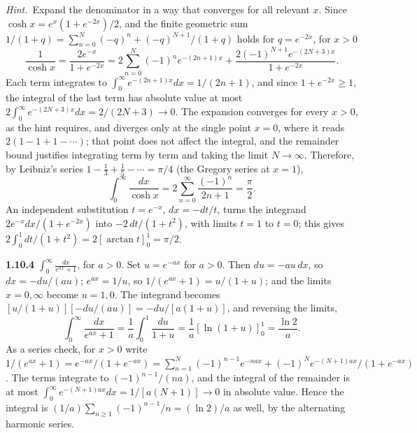 \emph{Hint.}~Expand the denominator in a way that converges for all relevant $x$.
\solution
Since $\cosh x=e^x(1+e^{-2x})/2$, and the finite geometric sum
$1/(1+q)=\sum_{n=0}^N(-q)^n+(-q)^{N+1}/(1+q)$ holds for $q=e^{-2x}$,
for $x>0$
\[
 \frac1{\cosh x}=\frac{2e^{-x}}{1+e^{-2x}}
 =2\sum_{n=0}^N(-1)^ne^{-(2n+1)x}
  +\frac{2(-1)^{N+1}e^{-(2N+3)x}}{1+e^{-2x}}.
\]
Each term integrates to $\int_0^\infty e^{-(2n+1)x}dx=1/(2n+1)$, and
since $1+e^{-2x}\ge1$, the integral of the last term has absolute
value at most $2\int_0^\infty e^{-(2N+3)x}dx=2/(2N+3)\to0$. The
expansion converges for every $x>0$, as the hint requires, and diverges
only at the single point $x=0$, where it reads $2(1-1+1-\cdots)$; that
point does not affect the integral, and the remainder bound justifies
integrating term by term and taking the limit $N\to\infty$. Therefore,
by Leibniz's series
$1-\frac13+\frac15-\cdots=\pi/4$ (the Gregory series at $x=1$),
\[
 \int_0^\infty\frac{dx}{\cosh x}
 =2\sum_{n=0}^\infty\frac{(-1)^n}{2n+1}=\boxed{\frac\pi2}.
\]
An independent substitution $t=e^{-x}$, $dx=-dt/t$, turns the
integrand $2e^{-x}dx/(1+e^{-2x})$ into $-2\,dt/(1+t^2)$, with limits
$t=1$ to $t=0$; this gives $2\int_0^1dt/(1+t^2)=2[\arctan t]_0^1=\pi/2$.


\par\bigskip
\noindent\textbf{1.10.4}\quad
$\displaystyle\int_{0}^{\infty}\frac{dx}{e^{ax}+1}$, for $a>0$.
\solution
Set $u=e^{-ax}$ for $a>0$. Then $du=-au\,dx$, so $dx=-du/(au)$;
$e^{ax}=1/u$, so $1/(e^{ax}+1)=u/(1+u)$; and the limits $x=0,\infty$
become $u=1,0$. The integrand becomes
$[u/(1+u)][-du/(au)]=-du/[a(1+u)]$, and reversing the limits,
\[
 \int_0^\infty\frac{dx}{e^{ax}+1}
 =\frac1a\int_0^1\frac{du}{1+u}
 =\frac1a[\ln(1+u)]_0^1
 =\boxed{\frac{\ln2}{a}}.
\]
As a series check, for $x>0$ write
$1/(e^{ax}+1)=e^{-ax}/(1+e^{-ax})
=\sum_{n=1}^N(-1)^{n-1}e^{-nax}+(-1)^Ne^{-(N+1)ax}/(1+e^{-ax})$.
The terms integrate to $(-1)^{n-1}/(na)$, and the integral of the
remainder is at most $\int_0^\infty e^{-(N+1)ax}dx=1/[a(N+1)]\to0$
in absolute value. Hence the integral is
$(1/a)\sum_{n\ge1}(-1)^{n-1}/n=(\ln2)/a$ as well, by the alternating
harmonic series.


